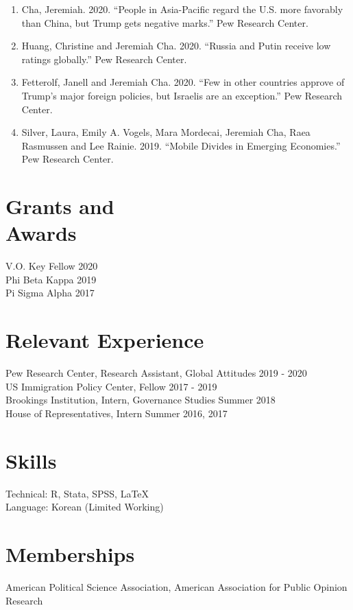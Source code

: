 \documentclass[margin, line]{res}
\begin{document}
\begin{resume}
\begin{enumerate}
\item Cha, Jeremiah. 2020. ``People in Asia-Pacific regard the U.S. more favorably than China, but Trump gets negative marks.'' Pew Research Center.

\item Huang, Christine and Jeremiah Cha. 2020. ``Russia and Putin receive low ratings globally.'' Pew Research Center.

\item Fetterolf, Janell and Jeremiah Cha. 2020. ``Few in other countries approve of Trump’s major foreign policies, but Israelis are an exception.'' Pew Research Center.

\item Silver, Laura, Emily A. Vogels, Mara Mordecai, Jeremiah Cha, Raea Rasmussen and Lee Rainie. 2019. ``Mobile Divides in Emerging Economies.'' Pew Research Center.

\end{enumerate}

\section{Grants and \\Awards}  
V.O. Key Fellow \hfill 2020\\
Phi Beta Kappa \hfill 2019\\
Pi Sigma Alpha \hfill 2017

\section{Relevant Experience}
Pew Research Center, Research Assistant, Global Attitudes \hfill 2019 - 2020\\
US Immigration Policy Center, Fellow \hfill 2017 - 2019\\
Brookings Institution, Intern, Governance Studies \hfill Summer 2018\\
House of Representatives, Intern \hfill Summer 2016, 2017
	
\section{Skills} 
Technical: R, Stata, SPSS, \LaTeX\\
Language: Korean (Limited Working)

\section{Memberships}
American Political Science Association, American Association for Public Opinion Research


\end{resume}
\end{document}
